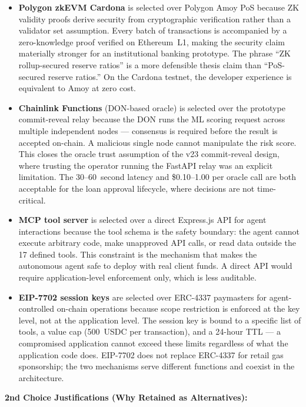 \documentclass[12pt,a4paper]{report}
\begin{document}
\begin{itemize}[noitemsep]
\item \textbf{Polygon zkEVM Cardona} is selected over Polygon Amoy PoS because ZK validity proofs derive security from cryptographic verification rather than a validator set assumption. Every batch of transactions is accompanied by a zero-knowledge proof verified on Ethereum~L1, making the security claim materially stronger for an institutional banking prototype. The phrase ``ZK rollup-secured reserve ratios'' is a more defensible thesis claim than ``PoS-secured reserve ratios.'' On the Cardona testnet, the developer experience is equivalent to Amoy at zero cost.

\item \textbf{Chainlink Functions} (DON-based oracle) is selected over the prototype commit-reveal relay because the DON runs the ML scoring request across multiple independent nodes --- consensus is required before the result is accepted on-chain. A malicious single node cannot manipulate the risk score. This closes the oracle trust assumption of the v23 commit-reveal design, where trusting the operator running the FastAPI relay was an explicit limitation. The 30--60~second latency and \$0.10--1.00 per oracle call are both acceptable for the loan approval lifecycle, where decisions are not time-critical.

\item \textbf{MCP tool server} is selected over a direct Express.js API for agent interactions because the tool schema is the safety boundary: the agent cannot execute arbitrary code, make unapproved API calls, or read data outside the 17 defined tools. This constraint is the mechanism that makes the autonomous agent safe to deploy with real client funds. A direct API would require application-level enforcement only, which is less auditable.

\item \textbf{EIP-7702 session keys} are selected over ERC-4337 paymasters for agent-controlled on-chain operations because scope restriction is enforced at the key level, not at the application level. The session key is bound to a specific list of tools, a value cap (500~USDC per transaction), and a 24-hour TTL --- a compromised application cannot exceed these limits regardless of what the application code does. EIP-7702 does not replace ERC-4337 for retail gas sponsorship; the two mechanisms serve different functions and coexist in the architecture.
\end{itemize}

\textbf{2nd Choice Justifications (Why Retained as Alternatives):}
\end{document}
